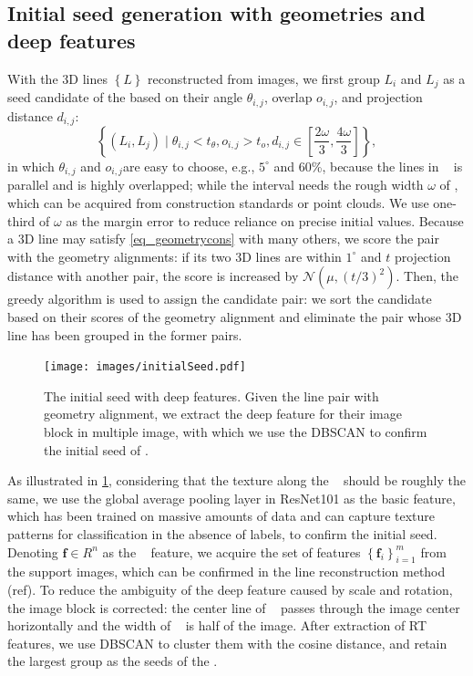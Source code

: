 \subsection{Initial seed generation with geometries and deep features}
\label{sec_initialseed}
With the 3D lines $\left\{L\right\}$ reconstructed from images,
we first group $L_i$ and $L_j$ as a seed candidate of the \rlp  based on their angle $\theta_{i,j}$,
overlap $o_{i,j}$,
and projection distance $d_{i,j}$:
\begin{equation}
   \left\{\left(L_i, L_j\right) \mid \theta_{i,j} < t_\theta, o_{i,j} > t_o, d_{i,j} \in \left[\frac{2\omega}{3} ,\frac{4\omega}{3}\right]  \right\},
    \label{eq_geometrycons}
\end{equation}
in which $\theta_{i,j}$ and $o_{i,j}$are easy to choose,
e.g.,
$5^\circ$ and 60\%,
because the lines in \rlp~ is parallel and is highly overlapped;
while the interval needs the rough width $\omega$ of \rlp,
which can be acquired from construction standards or point clouds.
We use one-third of $\omega$ as the margin error to reduce reliance on precise initial values.
Because a 3D line may satisfy \cref{eq_geometrycons} with many others,
we score the pair with the geometry alignments:
if its two 3D lines are within $1^\circ$ and $t$ projection distance with another pair,
the score is increased by $\mathcal{N}\left(\mu, \left(t/3\right)^2\right)$.
Then,
the greedy algorithm is used to assign the candidate pair:
we sort the candidate based on their scores of the geometry alignment and eliminate the pair whose 3D line has been grouped in the former pairs.

\begin{figure}[h]
    \centering
    \texttt{[image: images/initialSeed.pdf]}
    \caption{The initial seed with deep features.
    Given the line pair with geometry alignment, 
    we extract the deep feature for their image block in multiple image,
    with which we use the DBSCAN to confirm the initial seed of \rlp.}
    \label{fig_initialseed}
\end{figure}

As illustrated in \cref{fig_initialseed}, considering that the texture along the \rlp~ should be roughly the same, 
we use the global average pooling layer in ResNet101 as the basic feature,
which has been trained on massive amounts of data and can capture texture patterns for classification in the absence of labels,
to confirm the initial seed.
Denoting $\mathbf f \in R^n$ as the \rlp~ feature,
we acquire the set of features $\left\{\mathbf f_i\right\}_{i=1}^m$ from the support images,
which can be confirmed in the line reconstruction method (ref).
To reduce the ambiguity of the deep feature caused by scale and rotation,
the image block is corrected: the center line of \rlp~ passes through the image center horizontally and the width of \rlp~ is half of the image.
After extraction of RT features, 
we use DBSCAN to cluster them with the cosine distance,
and retain the largest group as the seeds of the \rlp.

